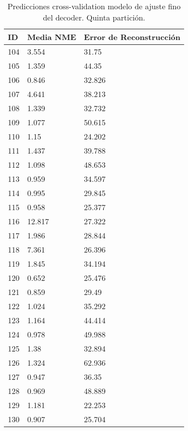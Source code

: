 \begin{table}[!ht]
    \centering
    \caption{Predicciones cross-validation modelo de ajuste fino del  decoder. Quinta partición.}
    \begin{tabular}{|l|l|l|}
    \hline
    \cellcolor{gray!25}\textbf{ID} & \cellcolor{gray!25}\textbf{Media NME} & \cellcolor{gray!25}\textbf{Error de Reconstrucción}\\ \hline
        104 & 3.554 & 31.75 \\ \hline
        105 & 1.359 & 44.35 \\ \hline
        106 & 0.846 & 32.826 \\ \hline
        107 & 4.641 & 38.213 \\ \hline
        108 & 1.339 & 32.732 \\ \hline
        109 & 1.077 & 50.615 \\ \hline
        110 & 1.15 & 24.202 \\ \hline
        111 & 1.437 & 39.788 \\ \hline
        112 & 1.098 & 48.653 \\ \hline
        113 & 0.959 & 34.597 \\ \hline
        114 & 0.995 & 29.845 \\ \hline
        115 & 0.958 & 25.377 \\ \hline
        116 & 12.817 & 27.322 \\ \hline
        117 & 1.986 & 28.844 \\ \hline
        118 & 7.361 & 26.396 \\ \hline
        119 & 1.845 & 34.194 \\ \hline
        120 & 0.652 & 25.476 \\ \hline
        121 & 0.859 & 29.49 \\ \hline
        122 & 1.024 & 35.292 \\ \hline
        123 & 1.164 & 44.414 \\ \hline
        124 & 0.978 & 49.988 \\ \hline
        125 & 1.38 & 32.894 \\ \hline
        126 & 1.324 & 62.936 \\ \hline
        127 & 0.947 & 36.35 \\ \hline
        128 & 0.969 & 48.889 \\ \hline
        129 & 1.181 & 22.253 \\ \hline
        130 & 0.907 & 25.704 \\ \hline
    \end{tabular}
    \label{table:Daugmentation_images_5}
\end{table}

\endinput
